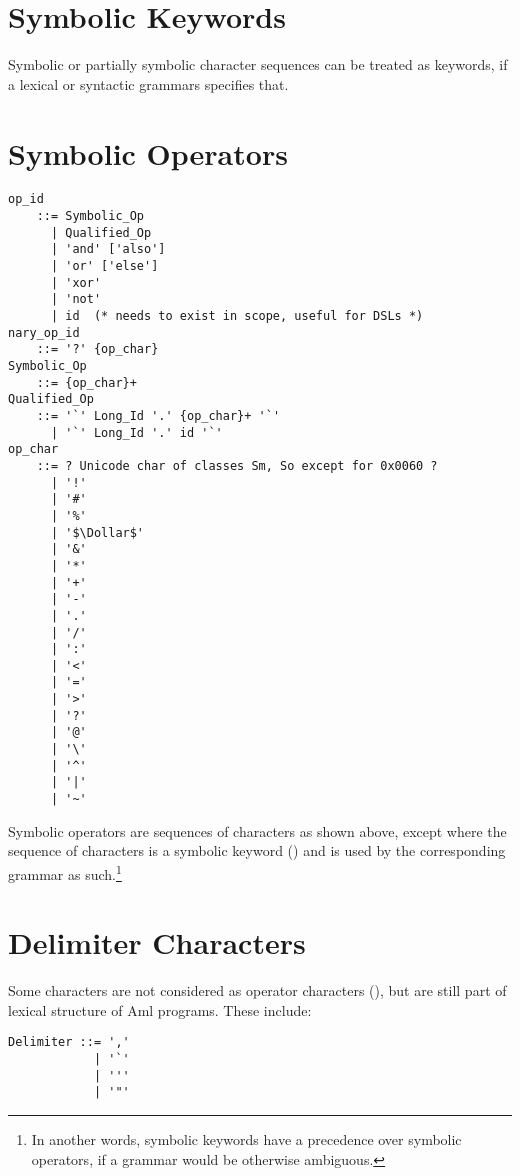 \section{Symbolic Keywords}
\label{sec:symbolic-keywords}

Symbolic or partially symbolic character sequences can be treated as keywords, if a lexical or syntactic grammars specifies that.





\section{Symbolic Operators}
\label{sec:symbolic-operators}

\syntax\begin{lstlisting}[deletekeywords={of,for}]
op_id 
    ::= Symbolic_Op
      | Qualified_Op
      | 'and' ['also']
      | 'or' ['else']
      | 'xor'
      | 'not'
      | id  (* needs to exist in scope, useful for DSLs *)
nary_op_id 
    ::= '?' {op_char}
Symbolic_Op  
    ::= {op_char}+
Qualified_Op 
    ::= '`' Long_Id '.' {op_char}+ '`'
      | '`' Long_Id '.' id '`'
op_char 
    ::= ? Unicode char of classes Sm, So except for 0x0060 ?
      | '!'
      | '#'
      | '%'
      | '$\Dollar$'
      | '&'
      | '*'
      | '+'
      | '-'
      | '.'
      | '/'
      | ':'
      | '<'
      | '='
      | '>'
      | '?'
      | '@'
      | '\'
      | '^'
      | '|'
      | '~'
\end{lstlisting}

Symbolic operators are sequences of characters as shown above, except where the sequence of characters is a symbolic keyword () and is used by the corresponding grammar as such.\footnote{In another words, symbolic keywords have a precedence over symbolic operators, if a grammar would be otherwise ambiguous.}





\section{Delimiter Characters}
\label{sec:delimiter-characters}

Some characters are not considered as operator characters (), but are still part of lexical structure of Aml programs. These include:

\syntax\begin{lstlisting}[deletekeywords={of}]
Delimiter ::= ','
            | '`'  
            | ''' 
            | '"'
\end{lstlisting}

